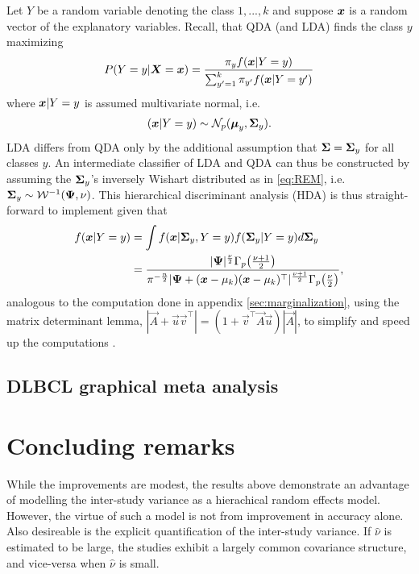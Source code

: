 \documentclass{article}\usepackage[]{graphicx}\usepackage[]{color}
\begin{document}
Let $Y$ be a random variable denoting the class $1, ..., k$ and suppose ${\boldsymbol{x}}$ is a random vector of the explanatory variables. Recall, that QDA (and LDA) finds the class $y$ maximizing
\begin{align*}
  P(Y = y | {\boldsymbol{X}} = {\boldsymbol{x}}) =
    \frac{\pi_y f({\boldsymbol{x}} | Y = y)}
         {\sum_{y' = 1}^k \pi_{y'} f({\boldsymbol{x}} | Y = y')}
\end{align*}
where ${\boldsymbol{x}} | Y = y$ is assumed multivariate normal, i.e.\
\begin{align*}
  ({\boldsymbol{x}} | Y = y) \sim \mathcal{N}_p(\boldsymbol{\mu}_y, {\boldsymbol{\Sigma}}_y).
\end{align*}
LDA differs from QDA only by the additional assumption that ${\boldsymbol{\Sigma}} = {\boldsymbol{\Sigma}}_y$ for all classes $y$. An intermediate classifier of LDA and QDA can thus be constructed by assuming the ${\boldsymbol{\Sigma}}_y$'s inversely Wishart distributed as in \eqref{eq:REM}, i.e.\ ${\boldsymbol{\Sigma}}_y \sim \mathcal{W}^{-1}({\boldsymbol{\Psi}}, \nu)$. This hierarchical discriminant analysis (HDA) is thus straight-forward to implement given that
\begin{align*}
f({\boldsymbol{x}} | Y = y)
  &= \int f({\boldsymbol{x}}| {\boldsymbol{\Sigma}}_y, Y = y) f({\boldsymbol{\Sigma}}_y | Y = y) d{\boldsymbol{\Sigma}}_y \\
  &= \frac{ |{\boldsymbol{\Psi}}|^{\frac{\nu}{2}} \Gamma_p\!\left(\frac{\nu + 1}{2}\right) }
          { \pi^{-\frac{n}{2}} |{\boldsymbol{\Psi}} + ({\boldsymbol{x}}-\mu_k)({\boldsymbol{x}}-\mu_k)^\top|^{\frac{\nu + 1}{2}}
            \Gamma_p\!\left(\frac{\nu}{2}\right)},
\end{align*}
analogous to the computation done in appendix \ref{sec:marginalization}, using the matrix determinant lemma, $|\vec{A} + \vec{u}\vec{v}^\top| = (1 + \vec{v}^\top\vec{A}\vec{u})|\vec{A}|$, to simplify and speed up the computations \citep{}.



\subsection{DLBCL graphical meta analysis}


\section{Concluding remarks}
While the improvements are modest, the results above demonstrate an advantage of modelling the inter-study variance as a hierachical random effects model. However, the virtue of such a model is not from improvement in accuracy alone. Also desireable is the explicit quantification of the inter-study variance. If $\hat{\nu}$ is estimated to be large, the studies exhibit  a largely common covariance structure, and vice-versa when $\hat{\nu}$ is small.
\end{document}
